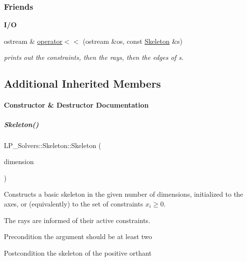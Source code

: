\subsubsection*{Friends}
\begin{Indent}\textbf{ I/O}\par
\begin{DoxyCompactItemize}
\item 
ostream \& \hyperlink{group___c_l_s_solvers_a54f8dc187ec3e238ccc80d7a44b9ca82}{operator$<$$<$} (ostream \&os, const \hyperlink{group___c_l_s_solvers_class_l_p___solvers_1_1_skeleton}{Skeleton} \&s)
\begin{DoxyCompactList}\small\item\em prints out the constraints, then the rays, then the edges of {\ttfamily s}. \end{DoxyCompactList}\end{DoxyCompactItemize}
\end{Indent}
\subsection*{Additional Inherited Members}


\paragraph{Constructor \& Destructor Documentation}
\mbox{\label{group___c_l_s_solvers_ad9f2f64c49dbf96ebd30852e670e7642}} 
\subparagraph{\texorpdfstring{Skeleton()}{Skeleton()}\hspace{0.1cm}{\footnotesize\ttfamily [1/2]}}
{\footnotesize\ttfamily L\+P\+\_\+\+Solvers\+::\+Skeleton\+::\+Skeleton (\begin{DoxyParamCaption}\item[{N\+V\+A\+R\+\_\+\+T\+Y\+PE}]{dimension }\end{DoxyParamCaption})}



Constructs a basic skeleton in the given number of dimensions, initialized to the axes, or (equivalently) to the set of constraints $ x_i \geq 0 $. 

The rays are informed of their active constraints. \begin{DoxyPrecond}{Precondition}
the argument should be at least two 
\end{DoxyPrecond}
\begin{DoxyPostcond}{Postcondition}
the skeleton of the positive orthant 
\end{DoxyPostcond}


